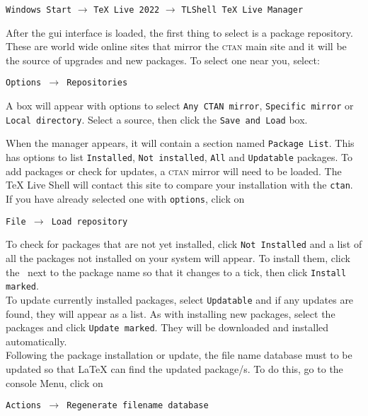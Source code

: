\documentclass[12pt, a4paper]{article}
\begin{document}
\begin{flushleft}
\texttt{Windows Start} $\rightarrow$ \texttt{TeX Live 2022} $\rightarrow$ \texttt{TLShell TeX Live Manager}
\end{flushleft}

After the gui interface is loaded, the first thing to select is a package repository. These are world wide online sites that mirror the \textsc{ctan} main site and it will be the source of upgrades and new packages. To select one near you, select:

\begin{flushleft}
\texttt{Options $\rightarrow$ Repositories}
\end{flushleft}

A box will appear with options to select \texttt{Any CTAN mirror}, \texttt{Specific mirror} or \texttt{Local directory}. Select a source, then click the \texttt{Save and Load} box.  

When the manager appears, it will contain a section named \texttt{Package List}. This has options to list \texttt{Installed}, \texttt{Not installed}, \texttt{All} and \texttt{Updatable} packages. To add packages or check for updates, a \textsc{ctan} mirror will need to be loaded. The TeX Live Shell will contact this site to compare your installation with the \texttt{ctan}. If you have already selected one with \texttt{options}, click on 

\begin{flushleft}
\texttt{File $\rightarrow$ Load repository}
\end{flushleft}

To check for packages that are not yet installed, click \texttt{Not Installed} and a list of all the packages not installed on your system will appear. To install them, click the \textopenbullet\ next to the package name so that it changes to a tick, then click \texttt{Install marked}. \\

To update currently installed packages, select \texttt{Updatable} and if any updates are found, they will appear as a list. As with installing new packages, select the packages and click \texttt{Update marked}. They will be downloaded and installed automatically. \\

Following the package installation or update, the file name database must to be updated so that LaTeX can find the updated package/s. To do this, go to the console Menu, click on 


\begin{flushleft}
\texttt{\texttt{Actions $\rightarrow$ Regenerate filename database}}
\end{flushleft}
\end{document}
